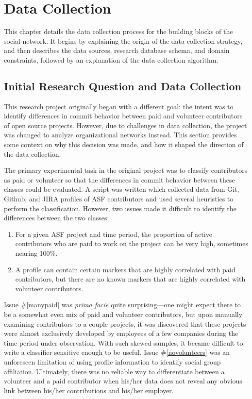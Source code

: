 \chapter{Data Collection}
This chapter details the data collection process for the building blocks of the social network. It begins by explaining the origin of the data collection strategy, and then describes the data sources, research database schema, and domain constraints, followed by an explanation of the data collection algorithm.

\section{Initial Research Question and Data Collection}

This research project originally began with a different goal: the intent was to identify differences in commit behavior between paid and volunteer contributors of open source projects. However, due to challenges in data collection, the project was changed to analyze organizational networks instead. This section provides some context on why this decision was made, and how it shaped the direction of the data collection.

The primary experimental task in the original project was to classify contributors as paid or volunteer so that the differences in commit behavior between these classes could be evaluated. A script was written which collected data from Git, Github, and JIRA profiles of ASF contributors and used several heuristics to perform the classification. 
However, two issues made it difficult to identify the differences between the two classes:
\begin{enumerate}
	\item \label{manypaid} For a given ASF project and time period, the proportion of active contributors who are paid to work on the project can be very high, sometimes nearing 100\%.
	\item \label{novolunteers} A profile can contain certain markers that are highly correlated with paid contributors, but there are no known markers that are highly correlated with volunteer contributors.
\end{enumerate}
Issue \#\ref{manypaid} was \emph{prima facie} quite surprising---one might expect there to be a somewhat even mix of paid and volunteer contributors, but upon manually examining contributors to a couple projects, it was discovered that these projects were almost exclusively developed by employees of a few companies during the time period under observation. With such skewed samples, it became difficult to write a classifier sensitive enough to be useful.
Issue \#\ref{novolunteers} was an unforeseen limitation of using profile information to identify social group affiliation. Ultimately, there was no reliable way to differentiate between a volunteer and a paid contributor when his/her data does not reveal any obvious link between his/her contributions and his/her employer.

